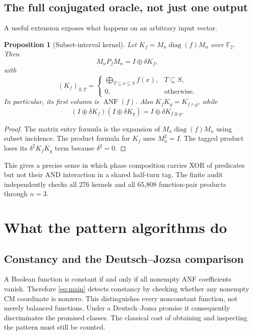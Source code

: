 \documentclass[11pt,a4paper]{article}
\newtheorem{proposition}[theorem]{Proposition}
\theoremstyle{definition}\newtheorem{definition}[theorem]{Definition}
\theoremstyle{remark}\newtheorem{remark}[theorem]{Remark}
\newcommand{\F}{\mathbb F}
\newcommand{\diag}{\operatorname{diag}}
\newcommand{\ANF}{\operatorname{ANF}}
\numberwithin{equation}{section}
\begin{document}
\subsection{The full conjugated oracle, not just one output}
A useful extension exposes what happens on an arbitrary input vector.
\begin{proposition}[Subset-interval kernel]\label{prop:interval}
Let $K_f=M_n\diag(f)M_n$ over $\F_2$. Then
\begin{equation}
 M_nP_fM_n=I\oplus\delta K_f,
\end{equation}
with
\begin{equation}\label{eq:interval}
 (K_f)_{S,T}=
 \begin{cases}
 \displaystyle\bigoplus_{T\subseteq x\subseteq S} f(x),&T\subseteq S,\\
 0,&\text{otherwise}.
 \end{cases}
\end{equation}
In particular, its first column is $\ANF(f)$. Also $K_fK_g=K_{f\land g}$, while
\begin{equation}
 (I\oplus\delta K_f)(I\oplus\delta K_g)
 =I\oplus\delta K_{f\oplus g}.
\end{equation}
\end{proposition}
\begin{proof}
The matrix entry formula is the expansion of $M_n\diag(f)M_n$ using subset incidence. The product formula for $K_f$ uses $M_n^2=I$. The tagged product loses its $\delta^2K_fK_g$ term because $\delta^2=0$.
\end{proof}
This gives a precise sense in which phase composition carries XOR of predicates but not their AND interaction in a shared half-turn tag. The finite audit independently checks all 276 kernels and all 65,808 function-pair products through $n=3$.

\section{What the pattern algorithms do}\label{sec:algorithms}
\subsection{Constancy and the Deutsch--Jozsa comparison}
A Boolean function is constant if and only if all nonempty ANF coefficients vanish. Therefore \cref{eq:main} detects constancy by checking whether any nonempty CM coordinate is nonzero. This distinguishes every nonconstant function, not merely balanced functions. Under a Deutsch--Jozsa promise it consequently discriminates the promised classes. The classical cost of obtaining and inspecting the pattern must still be counted.
\end{document}
